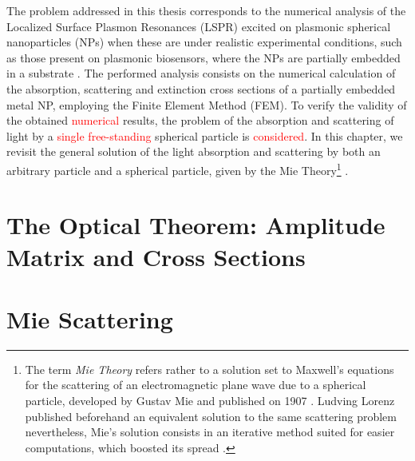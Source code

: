 \documentclass[11pt]{Latex/Classes/PhDthesisPSnPDF}
\begin{document}
  The problem addressed in this thesis corresponds to the numerical analysis of the Localized Surface Plasmon Resonances (LSPR)  excited on plasmonic spherical nanoparticles (NPs) when these are under realistic experimental conditions, such as those present on plasmonic biosensors, where the NPs are partially embedded in a substrate \cite{moirangthem_enhanced_2012}. The performed analysis consists on the numerical calculation of the absorption, scattering and extinction  cross sections of a partially embedded metal NP, employing the Finite Element Method (FEM). To verify the validity of the obtained \textcolor{red}{numerical} results, the problem of the absorption and scattering of light by a \textcolor{red}{single free-standing} spherical particle is \textcolor{red}{considered}. In this chapter, we revisit the general solution of the light absorption and scattering by both an arbitrary particle and a spherical particle, given by the Mie Theory\footnote{The term \emph{Mie Theory} refers rather to a solution set to Maxwell's equations for the scattering of an electromagnetic plane wave due to a spherical particle, developed by Gustav Mie and published on 1907 \cite{mie_beitrage_1908}. Ludving Lorenz published beforehand an equivalent solution to the same scattering problem nevertheless, Mie's solution consists in an iterative method suited for easier computations, which boosted its spread \cite{horvath_gustav_2009}. } \cite{bohren_absorption_1983}.

	\section{The Optical Theorem: Amplitude Matrix and Cross Sections}
	 \label{s:AmpMatCrossSect}
	 

	\section{Mie Scattering}
	  \label{s:Mie}
\end{document}
